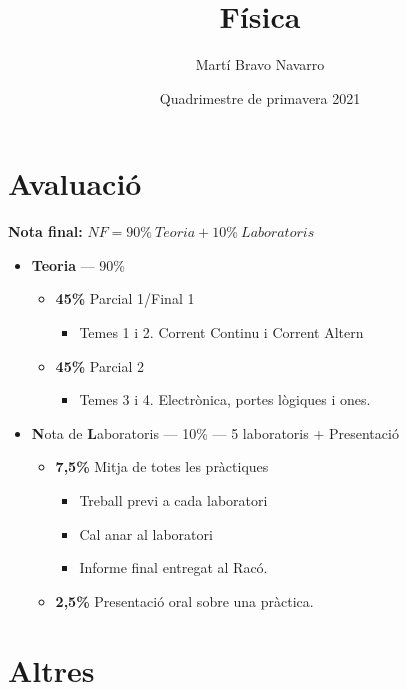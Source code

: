 \documentclass[12pt, a4paper, twoside]{report}
\title{Física}
\author{Martí Bravo Navarro}
\date{Quadrimestre de primavera 2021}
\begin{document}
\begin{titlepage}
\maketitle
\end{titlepage}

\section*{Avaluació}
\textbf{Nota final:} \(NF = 90\%  \ Teoria + 10\%  \ Laboratoris\)
\begin{itemize}
    \item \textbf{Teoria} --- 90\%
    \begin{itemize}
        
            \item \textbf{45\%} Parcial 1/Final 1
        \begin{itemize}
            \item Temes 1 i 2. Corrent Continu i Corrent Altern
        \end{itemize}
        \item \textbf{45\%} Parcial 2
        \begin{itemize}
            \item Temes 3 i 4. Electrònica, portes lògiques i ones.     
        \end{itemize}
    \end{itemize}
    \item \textbf{N}ota de \textbf{L}aboratoris --- 10\% --- 5 laboratoris + Presentació
    \begin{itemize}
        \item \textbf{7,5\%} Mitja de totes les pràctiques
        \begin{itemize}
            \item Treball previ a cada laboratori
            \item Cal anar al laboratori
            \item Informe final entregat al Racó.
        \end{itemize}
        \item \textbf{2,5\%} Presentació oral sobre una pràctica. 
        
    \end{itemize}
  \end{itemize}

\section*{Altres}
\end{document}
